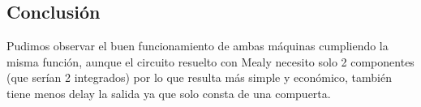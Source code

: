 \subsection*{Conclusión}
Pudimos observar el buen funcionamiento de ambas máquinas cumpliendo la misma función, aunque el circuito resuelto con Mealy necesito solo 2 componentes (que serían 2 integrados) por lo que resulta más simple y económico, también tiene menos delay la salida ya que solo consta de una compuerta.